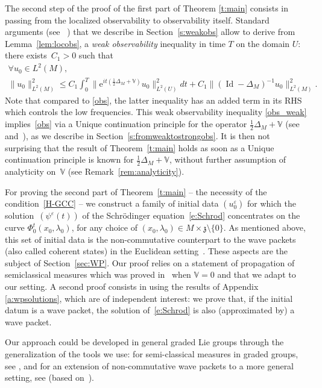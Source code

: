 \documentclass[JEP,XML,SOM,Unicode,published]{cedram}
\newcommand{\rme}{\mathrm{e}}
\DeclareMathOperator{\Id}{Id}
\theoremstyle{plain}
\theoremstyle{definition}
\let\eps\varepsilon
\def\bbV{{\mathbb V}}
\begin{document}
The second step of the proof of the first part of Theorem \ref{t:main} consists in passing from the localized observability to observability itself.
Standard arguments (see ~\cite{BZ}) that we describe in Section~\ref{s:weakobs} allow to derive from Lemma~\ref{lem:locobs}, a \emph{weak observability} inequality in time $T$ on the domain $U$: there exists~$C_1>0$ such that
\begin{multline}\label{obs_weak}
\forall u_0\in L^2(M),\\[-5pt]
\|u_0\|^2_{L^2(M)} \leq C_1 \int_0^T \bigl\| \rme^{it(\frac12 \Delta_M+\bbV)} u_0 \bigr\|^2_{L^2(U)} dt
+ C_1 \| (\Id-\Delta_M)^{-1} u_0\|^2_{L^2(M)}.
\end{multline}
Note that compared to \eqref{obs}, the latter inequality has an added term in its RHS which controls the low frequencies. This weak observability inequality \eqref{obs_weak} implies~\eqref{obs} via a Unique continuation principle for the operator $\frac12\Delta_M+\bbV$ (see~\cite{Bon69} and~\cite{Laur}), as we describe in Section~\ref{s:fromweaktostrongobs}. It is then not surprising that the result of Theorem~\ref{t:main} holds as soon as a Unique continuation principle is known for $\frac12\Delta_M+\bbV$, without further assumption of analyticity on~$\bbV$ (see Remark~\ref{rem:analyticity}).

For proving the second part of Theorem~\ref{t:main} -- the necessity of the condition~\eqref{H-GCC} -- we construct a family of initial data $(u^\eps_0)$ for which the solution~$(\psi^\eps(t))$ of the Schrödinger equation~\eqref{e:Schrod} concentrates on the curve $\Phi^t_0(x_0,\lambda_0)$, for any choice of $(x_0,\lambda_0)\in M\times \mathfrak z\setminus \{0\}$. As mentioned above, this set of initial data is the non-commutative counterpart to the wave packets (also called coherent states) in the Euclidean setting~\cite{CR,hag}. These aspects are the subject of Section~\ref{sec:WP}. Our proof relies on a statement of propagation of semiclassical measures which was proved in~\cite{FF} when $\bbV=0$ and that we adapt to our setting. A second proof consists in using the results of Appendix \ref{a:wpsolutions}, which are of independent interest: we prove that, if the initial datum is a wave packet, the solution of~\eqref{e:Schrod} is also (approximated by) a wave packet.

Our approach
could be developed in general graded Lie groups through the generalization of the tools we use: for semi-classical measures in graded groups, see \cite[Rem.\,3.3 \& 4.4]{FF1}, and for an extension of non-commutative wave packets to a more general setting, see \cite[\S\S6.3 \& 6.4]{FF18} (based on~\cite{pedersen}).
\end{document}
